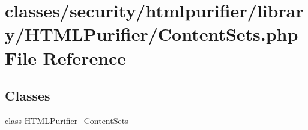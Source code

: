 \hypertarget{ContentSets_8php}{\section{classes/security/htmlpurifier/library/\+H\+T\+M\+L\+Purifier/\+Content\+Sets.php File Reference}
\label{ContentSets_8php}
}
\subsection*{Classes}
\begin{DoxyCompactItemize}
\item 
class \hyperlink{classHTMLPurifier__ContentSets}{H\+T\+M\+L\+Purifier\+\_\+\+Content\+Sets}
\end{DoxyCompactItemize}

